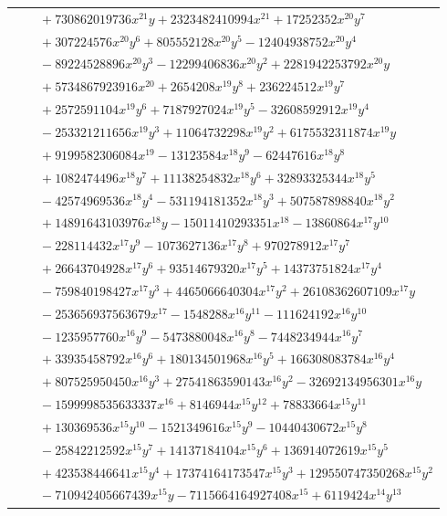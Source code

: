 \documentclass[11pt]{article}
\begin{document}
\begin{longtable}{@{}ll@{}}
 & $\quad +730862019736x^{21}y+2323482410994x^{21}+17252352x^{20}y^{7}$\\
 & $\quad +307224576x^{20}y^{6}+805552128x^{20}y^{5}-12404938752x^{20}y^{4}$\\
 & $\quad -89224528896x^{20}y^{3}-12299406836x^{20}y^{2}+2281942253792x^{20}y$\\
 & $\quad +5734867923916x^{20}+2654208x^{19}y^{8}+236224512x^{19}y^{7}$\\
 & $\quad +2572591104x^{19}y^{6}+7187927024x^{19}y^{5}-32608592912x^{19}y^{4}$\\
 & $\quad -253321211656x^{19}y^{3}+11064732298x^{19}y^{2}+6175532311874x^{19}y$\\
 & $\quad +9199582306084x^{19}-13123584x^{18}y^{9}-62447616x^{18}y^{8}$\\
 & $\quad +1082474496x^{18}y^{7}+11138254832x^{18}y^{6}+32893325344x^{18}y^{5}$\\
 & $\quad -42574969536x^{18}y^{4}-531194181352x^{18}y^{3}+507587898840x^{18}y^{2}$\\
 & $\quad +14891643103976x^{18}y-15011410293351x^{18}-13860864x^{17}y^{10}$\\
 & $\quad -228114432x^{17}y^{9}-1073627136x^{17}y^{8}+970278912x^{17}y^{7}$\\
 & $\quad +26643704928x^{17}y^{6}+93514679320x^{17}y^{5}+14373751824x^{17}y^{4}$\\
 & $\quad -759840198427x^{17}y^{3}+4465066640304x^{17}y^{2}+26108362607109x^{17}y$\\
 & $\quad -253656937563679x^{17}-1548288x^{16}y^{11}-111624192x^{16}y^{10}$\\
 & $\quad -1235957760x^{16}y^{9}-5473880048x^{16}y^{8}-7448234944x^{16}y^{7}$\\
 & $\quad +33935458792x^{16}y^{6}+180134501968x^{16}y^{5}+166308083784x^{16}y^{4}$\\
 & $\quad +807525950450x^{16}y^{3}+27541863590143x^{16}y^{2}-32692134956301x^{16}y$\\
 & $\quad -1599998535633337x^{16}+8146944x^{15}y^{12}+78833664x^{15}y^{11}$\\
 & $\quad +130369536x^{15}y^{10}-1521349616x^{15}y^{9}-10440430672x^{15}y^{8}$\\
 & $\quad -25842212592x^{15}y^{7}+14137184104x^{15}y^{6}+136914072619x^{15}y^{5}$\\
 & $\quad +423538446641x^{15}y^{4}+17374164173547x^{15}y^{3}+129550747350268x^{15}y^{2}$\\
 & $\quad -710942405667439x^{15}y-7115664164927408x^{15}+6119424x^{14}y^{13}$\\

\end{longtable}
\end{document}
